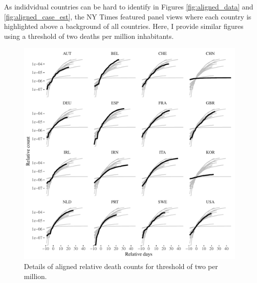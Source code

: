 \documentclass[fullpage,a4paper]{article}
\begin{document}
As indidvidual countries can be hard to identify in Figures
\ref{fig:aligned_data} and \ref{fig:aligned_case_est}, the NY Times
featured panel views where each country is highlighted above a
background of all countries. Here, I provide similar figures using a
threshold of two deaths per million inhabitants.
\begin{figure}
  \includegraphics[width=1\textwidth]{../figs/ecdc_aligned_twopermill_nyt.pdf}
  \caption{\label{fig:align_nyt} Details of aligned relative death
    counts for threshold of two per million.}
\end{figure}
\end{document}
